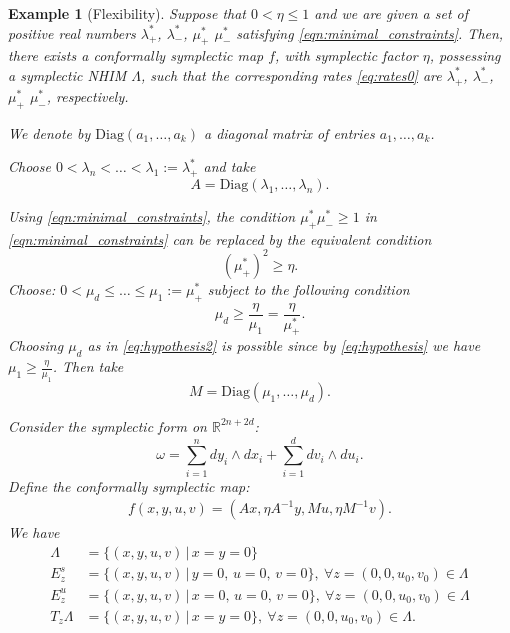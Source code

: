 \documentclass[11pt]{amsart}
\newtheorem{ex}[thm]{Example}
\theoremstyle{definition}
\theoremstyle{remark}
\numberwithin{equation}{section}
\def\real{{\mathbb R}}
\begin{document}
\begin{ex}[Flexibility]\label{lem:flexibility}
Suppose that $0<\eta\le 1 $ and we are given a set of positive real numbers $\lambda_+^*$, $\lambda_-^*$, $\mu_+^*$ $\mu_-^*$ satisfying \eqref{eqn:minimal_constraints}.
Then, there exists a conformally symplectic map $f$,  with symplectic factor $\eta$, possessing a symplectic NHIM $\Lambda$,
such that the corresponding rates \eqref{eq:rates0}  are $\lambda_+^*$, $\lambda_-^*$, $\mu_+^*$ $\mu_-^*$, respectively.




We denote by $\textrm{Diag}(a_1,\ldots,a_k)$   a diagonal matrix of entries $a_1,\ldots, a_k$.

Choose  $0<\lambda_n<\ldots <\lambda_1:=\lambda_+^*$ and take
\[
A=\textrm{Diag}(\lambda_1,\ldots,\lambda_n).
\]

Using \eqref{eqn:minimal_constraints},
the condition $\mu_+^*\mu_-^* \ge 1$ in \eqref{eqn:minimal_constraints} can be replaced by the equivalent condition
\begin{equation}\label{eq:hypothesis}
 (\mu^*_+)^2\ge \eta .
\end{equation}
Choose:
$0<\mu_d\le\ldots \le \mu_1:=\mu_+^*$ subject to the following condition
\begin{equation}\label{eq:hypothesis2}
\mu_d\ge \frac{\eta}{\mu_1} = \frac{\eta}{\mu^*_+} .
\end{equation}
Choosing $\mu_d$ as in \eqref{eq:hypothesis2} is possible since  by  \eqref{eq:hypothesis} we have $\mu_1\ge \frac{\eta}{\mu_1}$.
Then take
\[
M=\textrm{Diag}(\mu_1,\ldots,\mu_d ).
\]


Consider the  symplectic form  on $\real^{2n+2d}$:
\[
 \omega=\sum_{i=1}^{n} dy_i\wedge dx_i + \sum_{i=1}^{d} dv_i\wedge du_i .
 \]
Define  the conformally symplectic  map:
\begin{equation}\label{eqn:simple_1}
\begin{split}
f(x,y,u,v)=\left (A x,\eta A^{-1} y, M u, \eta M^{-1} v\right).
 \end{split}
\end{equation}
We have
\[
\begin{split}
\Lambda &=\{(x,y,u,v)\,|\, x=y=0\} \\
E^s_z  &=\{(x,y,u,v)\,|\, y=0, \, u=0, \, v=0\}, \ \forall z=(0,0,u_0,v_0)\in \Lambda \\
E^u_z  &=\{(x,y,u,v)\,|\, x=0, \, u=0, \, v=0\}, \ \forall z=(0,0,u_0,v_0)\in \Lambda \\
T_z \Lambda  &=\{(x,y,u,v)\,|\, x=y=0\}, \ \forall  z=(0,0,u_0,v_0)\in \Lambda .
\end{split}
\]


\end{ex}
\end{document}

